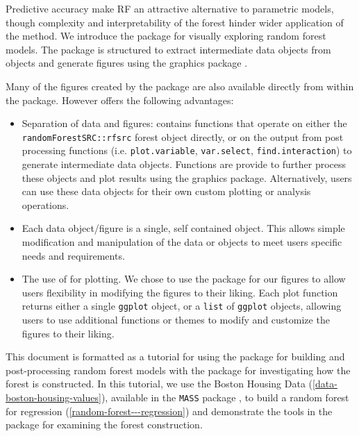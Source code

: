 \documentclass[article]{jss}
\begin{document}
Predictive accuracy make RF an attractive alternative to parametric
models, though complexity and interpretability of the forest hinder
wider application of the method. We introduce the 
package for visually exploring random forest models. The
 package is structured to extract intermediate data
objects from  objects and generate figures using
the  graphics package \citep{Wickham:2009}.

Many of the figures created by the  package are
also available directly from within the  package.
However  offers the following advantages:

\begin{itemize}
\item
  Separation of data and figures:  contains
  functions that operate on either the \texttt{randomForestSRC::rfsrc}
  forest object directly, or on the output from 
  post processing functions (i.e. \texttt{plot.variable},
  \texttt{var.select}, \texttt{find.interaction}) to generate
  intermediate  data objects. Functions are provide
  to further process these objects and plot results using the
   graphics package. Alternatively, users can use these
  data objects for their own custom plotting or analysis operations.
\item
  Each data object/figure is a single, self contained object. This
  allows simple modification and manipulation of the data or
   objects to meet users specific needs and requirements.
\item
  The use of  for plotting. We chose to use the
   package for our figures to allow users flexibility in
  modifying the figures to their liking. Each plot function returns
  either a single \texttt{ggplot} object, or a \texttt{list} of
  \texttt{ggplot} objects, allowing users to use additional
   functions or themes to modify and customize the figures
  to their liking.
\end{itemize}

This document is formatted as a tutorial for using the
 package for building and post-processing random
forest models with the  package for investigating
how the forest is constructed. In this tutorial, we use the Boston
Housing Data (\autoref{data-boston-housing-values}), available in the
\texttt{MASS} package \citep{mass:2002}, to build a random forest for
regression (\autoref{random-forest---regression}) and demonstrate the
tools in the  package for examining the forest
construction.
\end{document}
